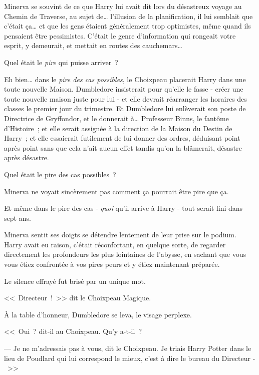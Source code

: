 Minerva se souvint de ce que Harry lui avait dit lors du désastreux voyage au Chemin de Traverse, au sujet de… l'illusion de la planification, il lui semblait que c'était ça… et que les gens étaient généralement trop optimistes, même quand ils pensaient être pessimistes. C'était le genre d'information qui rongeait votre esprit, y demeurait, et mettait en routes des cauchemars…

Quel était le \emph{pire} qui puisse arriver~?

Eh bien… dans le \emph{pire des cas possibles}, le Choixpeau placerait Harry dans une toute nouvelle Maison. Dumbledore insisterait pour qu'elle le fasse - créer une toute nouvelle maison juste pour lui - et elle devrait réarranger les horaires des classes le premier jour du trimestre. Et Dumbledore lui enlèverait son poste de Directrice de Gryffondor, et le donnerait à… Professeur Binns, le fantôme d'Histoire~; et elle serait assignée à la direction de la Maison du Destin de Harry~; et elle essaierait futilement de lui donner des ordres, déduisant point après point sans que cela n'ait aucun effet tandis qu'on la blâmerait, désastre après désastre.

Quel était le pire des cas possibles~?

Minerva ne voyait sincèrement pas comment ça pourrait être pire que ça.

Et même dans le pire des cas - \emph{quoi} qu'il arrive à Harry - tout serait fini dans sept ans.

Minerva sentit ses doigts se détendre lentement de leur prise sur le podium. Harry avait eu raison, c'était réconfortant, en quelque sorte, de regarder directement les profondeurs les plus lointaines de l'abysse, en sachant que vous vous étiez confrontée à vos pires peurs et y étiez maintenant préparée.

Le silence effrayé fut brisé par un unique mot.

<<~Directeur~!~>> dit le Choixpeau Magique.

À la table d'honneur, Dumbledore se leva, le visage perplexe.

<<~Oui~? dit-il au Choixpeau. Qu'y a-t-il~?

--- Je ne m'adressais pas à vous, dit le Choixpeau. Je triais Harry Potter dans le lieu de Poudlard qui lui correspond le mieux, c'est à dire le bureau du Directeur -~>> 

